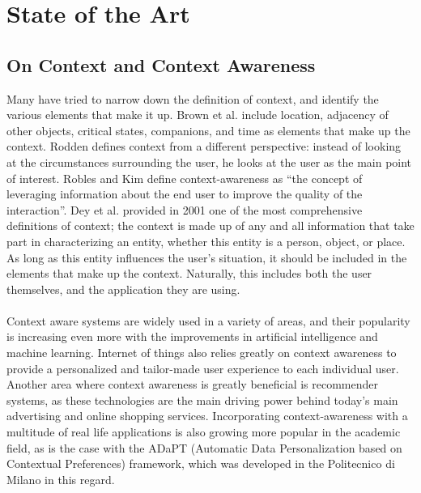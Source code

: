 \chapter{State of the Art}
\label{capitolo2}
\thispagestyle{empty}

\section{On Context and Context Awareness}
Many have tried to narrow down the definition of context, and identify the various elements that make it up. Brown et al.\cite{kar21408} include location, adjacency of other objects, critical states, companions, and time as elements that make up the context. Rodden\cite{Rodden98exploitingcontext} defines context from a different perspective: instead of looking at the circumstances surrounding the user, he looks at the user as the main point of interest. Robles and Kim\cite{Robles2010CA} define context-awareness as ``the concept of leveraging information about the end user to improve the quality of the interaction''. Dey et al.\cite{deycontext} provided in 2001 one of the most comprehensive definitions of context; the context is made up of any and all information that take part in characterizing an entity, whether this entity is a person, object, or place. As long as this entity influences the user's situation, it should be included in the elements that make up the context. Naturally, this includes both the user themselves, and the application they are using. \\\\
Context aware systems are widely used in a variety of areas, and their popularity is increasing even more with the improvements in artificial intelligence and machine learning. Internet of things also relies greatly on context awareness to provide a personalized and tailor-made user experience to each individual user. Another area where context awareness is greatly beneficial is recommender systems, as these technologies are the main driving power behind today's main advertising and online shopping services. Incorporating context-awareness with a multitude of real life applications is also growing more popular in the academic field, as is the case with the ADaPT (Automatic Data Personalization based on Contextual Preferences) framework\cite{adaptpolimi}, which was developed in the Politecnico di Milano in this regard.

